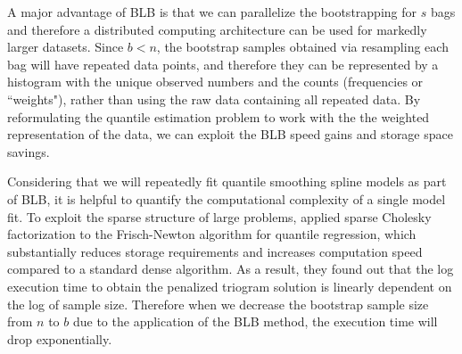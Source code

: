 \documentclass{statsoc}
\begin{document}
A major advantage of BLB is that we can parallelize the bootstrapping for $s$ bags and therefore a distributed computing architecture can be used for markedly larger datasets. Since $b<n$, the bootstrap samples obtained via resampling each bag will have repeated data points, and therefore they can be represented by a histogram with the unique observed numbers and the counts (frequencies or ``weights"), rather than using the raw data containing all repeated data. By reformulating the quantile estimation problem to work with the the weighted representation of the data, we can exploit the BLB speed gains and storage space savings.

Considering that we will repeatedly fit quantile smoothing spline models as part of BLB, it is helpful to quantify the computational complexity of a single model fit. To exploit the sparse structure of large problems, \citet{koenker2005frisch} applied sparse Cholesky factorization to the Frisch-Newton algorithm for quantile regression, which substantially reduces storage requirements and increases computation speed compared to a standard dense algorithm. As a result, they found out that the log execution time to obtain the penalized triogram solution is linearly dependent on the log of sample size. Therefore when we decrease the bootstrap sample size from $n$ to $b$ due to the application of the BLB method, the execution time will drop exponentially.  
\end{document}
